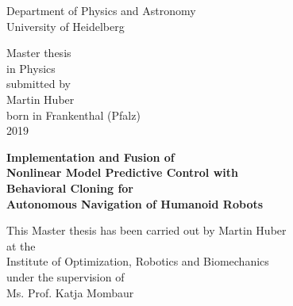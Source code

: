 
\thispagestyle{empty}
\begin{center}
  \renewcommand{\baselinestretch}{2.00}
  \Large\sffamily
  Department of Physics and Astronomy\\
  \large University of Heidelberg
  \par\vfill\normalfont
  Master thesis\\
  in Physics\\
  submitted by\\
  Martin Huber\\
  born in Frankenthal (Pfalz)\\
  2019
\end{center}
\newpage

\thispagestyle{empty}
\begin{center}
  \renewcommand{\baselinestretch}{2.00}
  \Large\bfseries\sffamily
    Implementation and Fusion of \\
	Nonlinear Model Predictive Control with \\
	Behavioral Cloning for \\ 
	Autonomous Navigation of Humanoid Robots
  \par
  \vfill
  \large\normalfont
  This Master thesis has been carried out by Martin Huber\\
  at the\\
  Institute of Optimization, Robotics and Biomechanics \\
  under the supervision of\\
  Ms. Prof. Katja Mombaur
\end{center}\par
\vspace{5\baselineskip}

\renewcommand{\baselinestretch}{1.00}\normalsize